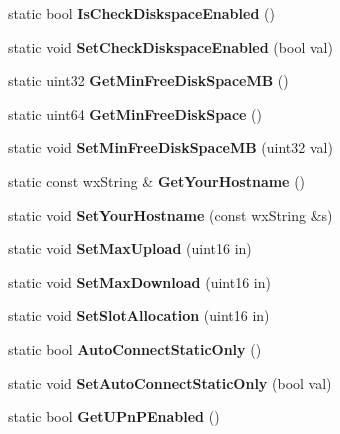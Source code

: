 \begin{DoxyCompactItemize}
\item 
static bool {\bfseries IsCheckDiskspaceEnabled} ()\label{classCPreferences_a8d9776a388dc9efdcf7005af36485ad8}

\item 
static void {\bfseries SetCheckDiskspaceEnabled} (bool val)\label{classCPreferences_a94005a8d94d007aec44fa4d4890c185e}

\item 
static uint32 {\bfseries GetMinFreeDiskSpaceMB} ()\label{classCPreferences_a02f8c5c91dc7d4e3fbf377633ee78495}

\item 
static uint64 {\bfseries GetMinFreeDiskSpace} ()\label{classCPreferences_ab88ea1b019f22d6645d1c1db2b0b0177}

\item 
static void {\bfseries SetMinFreeDiskSpaceMB} (uint32 val)\label{classCPreferences_a9b703e237cd435acabcff059b45eb057}

\item 
static const wxString \& {\bfseries GetYourHostname} ()\label{classCPreferences_ae66b1679f21197932a140245dc1db31c}

\item 
static void {\bfseries SetYourHostname} (const wxString \&s)\label{classCPreferences_aa00347dd0227c3fadd2e41af0ac55b2f}

\item 
static void {\bfseries SetMaxUpload} (uint16 in)\label{classCPreferences_a32ce419161ec5e16fa8ed08fbf193ea9}

\item 
static void {\bfseries SetMaxDownload} (uint16 in)\label{classCPreferences_a71886a90d5757e46c8a76ad1772dcb29}

\item 
static void {\bfseries SetSlotAllocation} (uint16 in)\label{classCPreferences_a8c760ff5a7dc55ead73e19500adaad7b}

\item 
static bool {\bfseries AutoConnectStaticOnly} ()\label{classCPreferences_afabff133d400b3e28909f7f2648204c6}

\item 
static void {\bfseries SetAutoConnectStaticOnly} (bool val)\label{classCPreferences_aaf2fccdd971c1836a9b72c02e58b58e2}

\item 
static bool {\bfseries GetUPnPEnabled} ()\label{classCPreferences_acd434a0c61ee9d5cc5664f05ed7e00fc}


\end{DoxyCompactItemize}
